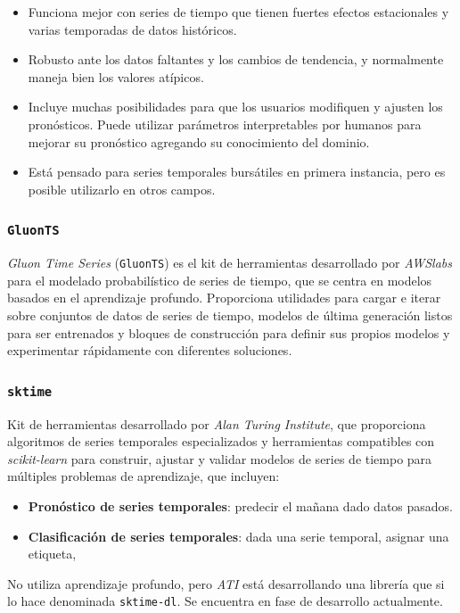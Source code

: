 \documentclass[a4paper,12pt]{article}
\begin{document}
\begin{itemize}
	\item Funciona mejor con series de tiempo que tienen fuertes efectos estacionales y varias temporadas de datos históricos.
	\item Robusto ante los datos faltantes y los cambios de tendencia, y normalmente maneja bien los valores atípicos.
	\item Incluye muchas posibilidades para que los usuarios modifiquen y ajusten los pronósticos. Puede utilizar parámetros interpretables por humanos para mejorar su pronóstico agregando su conocimiento del dominio.
	\item Está pensado para series temporales bursátiles en primera instancia, pero es posible utilizarlo en otros campos.
\end{itemize}

\subsubsection{\texttt{GluonTS}}
\textit{Gluon Time Series} (\texttt{GluonTS}) es el kit de herramientas desarrollado por \textit{AWSlabs} para el modelado probabilístico de series de tiempo, que se centra en modelos basados ​​en el aprendizaje profundo. Proporciona utilidades para cargar e iterar sobre conjuntos de datos de series de tiempo, modelos de última generación listos para ser entrenados y bloques de construcción para definir sus propios modelos y experimentar rápidamente con diferentes soluciones. \citep{gluonts}

\subsubsection{\texttt{sktime}}
Kit de herramientas desarrollado por \textit{Alan Turing Institute}, que proporciona algoritmos de series temporales especializados y herramientas compatibles con \textit{scikit-learn} para construir, ajustar y validar modelos de series de tiempo para múltiples problemas de aprendizaje, que incluyen: \citep{sktime}

\begin{itemize}
	\item \textbf{Pronóstico de series temporales}: predecir el mañana dado datos pasados.
	\item \textbf{Clasificación de series temporales}: dada una serie temporal, asignar una etiqueta,
\end{itemize}

No utiliza aprendizaje profundo, pero \textit{ATI} está desarrollando una librería que si lo hace denominada \texttt{sktime-dl}. Se encuentra en fase de desarrollo actualmente.
\end{document}
